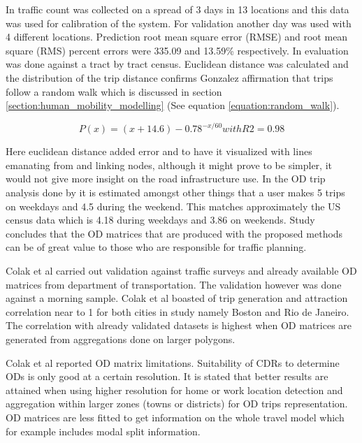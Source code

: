 \documentclass[12pt, a4paper]{report}
\theoremstyle{definition}
\theoremstyle{definition}%
\theoremstyle{definition}%
\theoremstyle{definition}%
\theoremstyle{definition}%
\theoremstyle{definition}%
\begin{document}
In \cite{Iqbal2014} traffic count was collected on a spread of 3 days in 13 locations and this data was used for calibration of the system.  For validation another day was used with 4 different locations. Prediction root mean square error (RMSE) and root mean square (RMS) percent errors were 335.09 and 13.59\% respectively. In \cite{Calabrese2011} evaluation was done against a tract by tract census. Euclidean distance was calculated and the distribution of the trip distance confirms Gonzalez affirmation that trips follow a random walk \cite{Gonzalez2008} which is discussed in section \ref{section:human_mobility_modelling}  (See equation \ref{equation:random_walk}).

\begin{equation}\label{equation:random_walk}
P(x) = (x+14.6)-0.78^{-x/60} with R2 = 0.98 
\end{equation}

Here euclidean distance added error and to have it visualized with lines emanating from and linking nodes, although it might prove to be simpler, it would not give more insight on the road infrastructure use. In the OD trip analysis done by \cite{Calabrese2011} it is estimated amongst other things that a user makes 5 trips on weekdays and 4.5 during the weekend. This matches approximately the US census data which is 4.18 during weekdays and 3.86 on weekends. Study concludes that the OD matrices that are produced with the proposed methods can be of great value to those who are responsible for traffic planning.

Colak et al carried out validation against traffic surveys and already available OD matrices from department of transportation.  The validation however was done against a morning sample. Colak et al boasted of trip generation and attraction correlation near to 1 for both cities in study namely Boston and Rio de Janeiro. The correlation with already validated datasets is highest when OD matrices are generated from aggregations done on larger polygons. 

Colak et al reported OD matrix limitations. Suitability of CDRs to determine ODs is only good at a certain resolution. It is stated that better results are attained when using higher resolution for home or work location detection and aggregation within larger zones (towns or districts) for OD trips representation. OD matrices are less fitted to get information on the whole travel model which for example includes modal split information.
\end{document}
